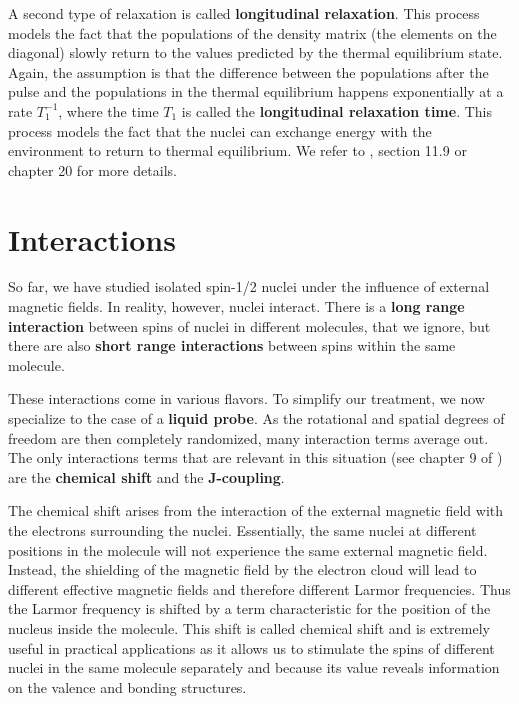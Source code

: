 \documentclass[a4paper, draft]{article}
\theoremstyle{own}
\theoremstyle{remark}
\begin{document}
A second type of relaxation is called {\bf longitudinal relaxation}. This process models the fact that the populations of the density matrix (the elements on the diagonal) slowly return to the values predicted by the thermal equilibrium state. Again, the assumption is that the difference between the populations after the pulse and the populations in the thermal equilibrium happens exponentially at a rate $T_1^{-1}$, where the time $T_1$ is called the {\bf longitudinal relaxation time}. This process models the fact that the nuclei can exchange energy with the environment to return to thermal equilibrium. We refer to \cite{Levitt}, section 11.9 or chapter 20 for more details. 


\section{Interactions}

So far, we have studied isolated spin-1/2 nuclei under the influence of external magnetic fields. In reality, however, nuclei interact. There is a {\bf long range interaction} between spins of nuclei in different molecules, that we ignore, but there are also {\bf short range interactions} between spins within the same molecule. 

These interactions come in various flavors. To simplify our treatment, we now specialize to the case of a {\bf liquid probe}. As the rotational and spatial degrees of freedom are then completely randomized, many interaction terms average out. The only interactions terms that are relevant in this situation (see chapter 9 of \cite{Levitt}) are the {\bf chemical shift} and the {\bf J-coupling}.
	
The chemical shift arises from the interaction of the external magnetic field with the electrons surrounding the nuclei. Essentially, the same nuclei at different positions in the molecule will not experience the same external magnetic field. Instead, the shielding of the magnetic field by the electron cloud will lead to different effective magnetic fields and therefore different Larmor frequencies. Thus the Larmor frequency is shifted by a term characteristic for the position of the nucleus inside the molecule. This shift is called chemical shift and is extremely useful in practical applications as it allows us to stimulate the spins of different nuclei in the same molecule separately and because its value reveals information on the valence and bonding structures.
\end{document}
